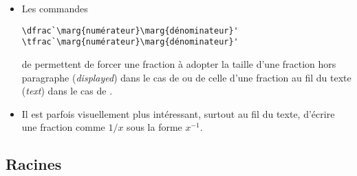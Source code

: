 \begin{itemize}
\item Les commandes
\begin{lstlisting}
\dfrac`\marg{numérateur}\marg{dénominateur}'
\tfrac`\marg{numérateur}\marg{dénominateur}'
\end{lstlisting}
  de  permettent de forcer une fraction à adopter la
  taille d'une fraction hors paragraphe (\emph{displayed}) dans le cas
  de \cmd{\dfrac} ou de celle d'une fraction au fil du texte
  (\emph{text}) dans le cas de \cmd{\tfrac}.
\item Il est parfois visuellement plus intéressant, surtout au fil du
  texte, d'écrire une fraction comme $1/x$ sous la forme $x^{-1}$.
\end{itemize}

\subsection{Racines}
\label{sec:math:bases:racines}

